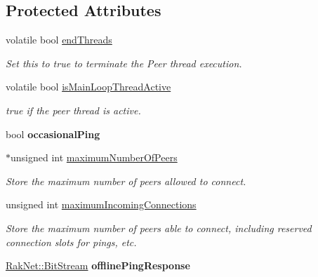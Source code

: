 \subsection*{Protected Attributes}
\begin{DoxyCompactItemize}
\item 
\hypertarget{class_rak_net_1_1_rak_peer_af64c716502f8489c8b674cde838e9d97}{volatile bool \hyperlink{class_rak_net_1_1_rak_peer_af64c716502f8489c8b674cde838e9d97}{end\-Threads}}\label{class_rak_net_1_1_rak_peer_af64c716502f8489c8b674cde838e9d97}

\begin{DoxyCompactList}\small\item\em Set this to true to terminate the Peer thread execution. \end{DoxyCompactList}\item 
\hypertarget{class_rak_net_1_1_rak_peer_af2f5e5755c03755c06eb7f1276f90f19}{volatile bool \hyperlink{class_rak_net_1_1_rak_peer_af2f5e5755c03755c06eb7f1276f90f19}{is\-Main\-Loop\-Thread\-Active}}\label{class_rak_net_1_1_rak_peer_af2f5e5755c03755c06eb7f1276f90f19}

\begin{DoxyCompactList}\small\item\em true if the peer thread is active. \end{DoxyCompactList}\item 
\hypertarget{class_rak_net_1_1_rak_peer_a95d25bc3c9904f7a2a4a6af6f1e56509}{bool {\bfseries occasional\-Ping}}\label{class_rak_net_1_1_rak_peer_a95d25bc3c9904f7a2a4a6af6f1e56509}

\item 
$\ast$unsigned int \hyperlink{class_rak_net_1_1_rak_peer_a9faf5bd4ea7dca603f967b6ee1ed40d9}{maximum\-Number\-Of\-Peers}
\begin{DoxyCompactList}\small\item\em Store the maximum number of peers allowed to connect. \end{DoxyCompactList}\item 
unsigned int \hyperlink{class_rak_net_1_1_rak_peer_a6244b23254ae6e95302b5060b3f1bc0e}{maximum\-Incoming\-Connections}
\begin{DoxyCompactList}\small\item\em Store the maximum number of peers able to connect, including reserved connection slots for pings, etc. \end{DoxyCompactList}\item 
\hypertarget{class_rak_net_1_1_rak_peer_a877e5bf32082b50989c989d5b50970df}{\hyperlink{class_rak_net_1_1_bit_stream}{Rak\-Net\-::\-Bit\-Stream} {\bfseries offline\-Ping\-Response}}\label{class_rak_net_1_1_rak_peer_a877e5bf32082b50989c989d5b50970df}


\end{DoxyCompactItemize}
